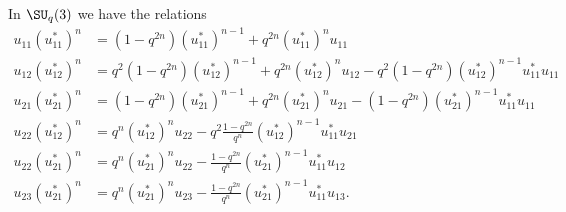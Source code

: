 \begin{lemma}       \label{Lemuijustijnstarnsubeqijuk}
	In \( \SU_q(3)\) we have the relations
	\begin{subequations}
		\begin{align}
			u_{11}(u_{11}^*)^n & =(1-q^{2n})(u_{11}^*)^{n-1}+q^{2n}(u_{11}^*)^nu_{11}     \label{subeqlemuijuklstarni}                               \\
			u_{12}(u_{12}^*)^n & =q^2(1-q^{2n})(u_{12}^*)^{n-1}+q^{2n}(u_{12}^*)^nu_{12}-q^2(1-q^{2n})(u_{12}^*)^{n-1}u_{11}^*u_{11}                 \\
			u_{21}(u_{21}^*)^n & =(1-q^{2n})(u_{21}^*)^{n-1}+q^{2n}(u_{21}^*)^nu_{21}-(1-q^{2n})(u_{21}^*)^{n-1}u_{11}^*u_{11}                       \\
			u_{22}(u_{12}^*)^n & =q^n(u_{12}^*)^nu_{22}-q^2\frac{ 1-q^{2n} }{ q^n }(u_{12}^*)^{n-1}u_{11}^*u_{21}     \label{subeqlemuijuklstarnivd} \\
			u_{22}(u_{21}^*)^n & =q^n(u_{21}^*)^nu_{22}-\frac{ 1-q^{2n} }{ q^n }(u_{21}^*)^{n-1}u_{11}^*u_{12}                                       \\
			u_{23}(u_{21}^*)^n & =q^n(u_{21}^*)^nu_{23}-\frac{ 1-q^{2n} }{ q^n }(u_{21}^*)^{n-1}u_{11}^*u_{13}.
		\end{align}
	\end{subequations}

\end{lemma}

